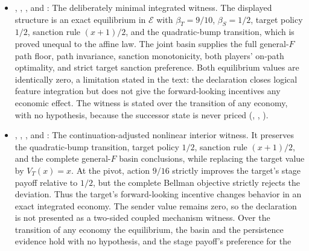 \begin{itemize}[leftmargin=1.4em,itemsep=1pt]
minimum-drift shock conclusion for every feasible shock start. The
strengthened corollary proves on the same equilibrium that the target
and sender values have discounted changes $9/2$ and $1/4$ between
explicit feasible states. It also records
$\alpha^E(1/2)=0$, $s^E(1/2)=7/8$, and the myopic-equilibrium sanction
$s^M(1/2)=5/14$. Thus the full-package application is
mechanism-active, not a constant-value artifact. Its cross-value rows
are nevertheless decoupled, and its concrete transition is the affine
member of the general-$F$ class; it does not establish a
nonlinear-transition witness with an interior target policy.
\item {}, ,
, and
: The
deliberately minimal integrated witness.  The displayed structure is
an exact equilibrium in $\mathcal E$ with
$\beta_T=9/10$, $\beta_S=1/2$, target policy $1/2$, sanction
rule $(x+1)/2$, and the quadratic-bump transition, which is proved
unequal to the affine law.  The joint basin supplies the full
general-$F$ path floor, path invariance, sanction monotonicity, both
players' on-path optimality, and strict target sanction preference.
Both equilibrium values are identically zero, a limitation stated in
the text: the declaration closes logical feature integration but does
not give the forward-looking incentives any economic effect.
The witness is stated over the transition of any economy, with no
hypothesis, because the successor state is never priced (,
, ).
\item {}, ,
, and
: The
continuation-adjusted nonlinear interior witness. It preserves the
quadratic-bump transition, target policy $1/2$, sanction rule
$(x+1)/2$, and the complete general-$F$ basin conclusions, while
replacing the target value by $V_T(x)=x$. At the pivot, action $9/16$
strictly improves the target's stage payoff relative to $1/2$, but the
complete Bellman objective strictly rejects the deviation. Thus the
target's forward-looking incentive changes behavior in an exact integrated
economy. The sender value remains zero, so the declaration is not
presented as a two-sided coupled mechanism witness. Over the transition of any
economy the equilibrium, the basin and the persistence
evidence hold with no hypothesis, and the stage payoff's preference for the

\end{itemize}
